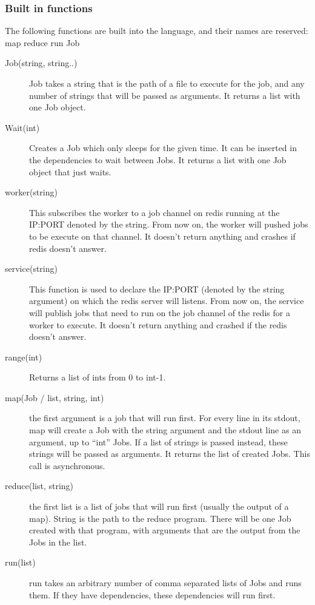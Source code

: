 \subsubsection{Built in functions}
The following functions are built into the language, and their names are reserved:\\
map reduce run Job\\
\begin{description}
  \item[Job(string, string..)] Job takes a string that is the path of a file to
    execute for the job, and any number of strings that will be passed as
    arguments. It returns a list with one Job object.
  \item[Wait(int)] Creates a Job which only sleeps for the given time. It can be inserted
  in the dependencies to wait between Jobs. It returns a list with one Job object that just
  waits.
  \item[worker(string)] This subscribes the worker to a job channel on redis running at
    the IP:PORT denoted by the string. From now on, the worker will pushed jobs to
    be execute on that channel. It doesn't return anything and crashes if redis doesn't
    answer.
  \item[service(string)] This function is used to declare
    the IP:PORT (denoted by the string argument) on which the redis server will listens.
    From now on, the service will publish jobs that need to run on the job channel of the redis
    for a worker to execute. It doesn't return anything and crashed if the redis doesn't
    answer.
  \item[range(int)] Returns a list of ints from 0 to int-1.
  \item[map(Job / list, string, int)] the first argument is a job that will run first. For every line in its stdout, map will create
    a Job with the string argument and the stdout line as an argument, up to ``int'' Jobs.
    If a list of strings is passed instead, these strings will be passed as arguments. It returns the list
    of created Jobs. This call is asynchronous.
  \item[reduce(list, string)] the first list is a list of jobs that will run first (usually the
    output of a map). String is the path to the reduce program. There will be one Job
    created with that program, with arguments that are the output from the Jobs in the list.
  \item[run(list)] run takes an arbitrary number of comma separated lists of Jobs
    and runs them. If they have dependencies, these dependencies will run first.
\end{description}

